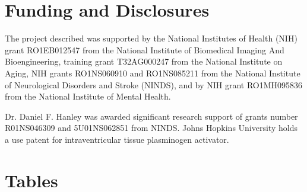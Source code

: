 \documentclass[10pt]{article}\usepackage[]{graphicx}\usepackage[]{color}
\begin{document}




\section{Funding and Disclosures}
The project described was supported by the National Institutes of Health (NIH) grant RO1EB012547 from the National Institute of Biomedical Imaging And Bioengineering, training grant T32AG000247 from the National Institute on Aging, NIH grants RO1NS060910 and  RO1NS085211 from the National Institute of Neurological Disorders and Stroke (NINDS), and by NIH grant RO1MH095836 from the National Institute of Mental Health. 

Dr. Daniel F. Hanley was awarded significant research support of grants number R01NS046309 and 5U01NS062851 from NINDS. Johns Hopkins University holds a use patent for intraventricular tissue plasminogen activator.





\newpage

% 
% 
\printbibliography

\newpage

\thispagestyle{empty}
\pagestyle{plain}
\section{Tables}




















\end{document}
